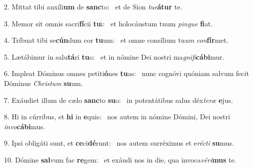 2. Mittat tibi auxíli\textbf{um} de \textbf{sanc}to: \ast\  et de Sion \textit{tu}\textit{e}\textbf{á}\textbf{tur} te.\

3. Memor sit omnis sacri\textbf{fí}cii \textbf{tu}i: \ast\  et holocáustum tuum \textit{pin}\textit{gue} \textbf{fi}at.\

4. Tríbuat tibi se\textbf{cún}dum cor \textbf{tu}um: \ast\  et omne consílium tu\textit{um} \textit{con}\textbf{fír}met.\

5. Lætábimur in salu\textbf{tá}ri \textbf{tu}o: \ast\  et in nómine Dei nostri ma\textit{gni}\textit{fi}\textbf{cá}\textbf{bi}mur.\

6. Impleat Dóminus omnes petiti\textbf{ó}nes \textbf{tu}as: \ast\  nunc cognóvi quóniam salvum fecit Dóminus \textit{Chris}\textit{tum} \textbf{su}um.\

7. Exáudiet illum de cælo \textbf{sanc}to \textbf{su}o: \ast\  in potentátibus salus déx\textit{te}\textit{ræ} \textbf{e}jus.\

8. Hi in cúrribus, et \textbf{hi} in \textbf{e}quis: \ast\  nos autem in nómine Dómini, Dei nostri \textit{in}\textit{vo}\textbf{cá}\textbf{bi}mus.\

9. Ipsi obligáti sunt, et \textbf{ce}ci\textbf{dé}runt: \ast\  nos autem surréximus et e\textit{réc}\textit{ti} \textbf{su}mus.\

10. Dómine \textbf{sal}vum fac \textbf{re}gem: \ast\  et exáudi nos in die, qua invoca\textit{vé}\textit{ri}\textbf{mus} te.\

